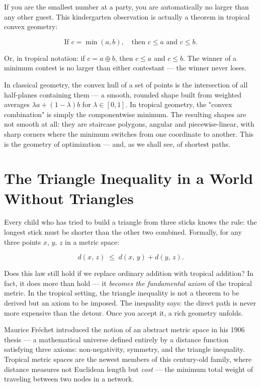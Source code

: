 \documentclass[11pt,twoside,openright]{book}
\theoremstyle{definition}
\theoremstyle{remark}
\begin{document}
If you are the smallest number at a party, you are automatically no larger than any other guest. This kindergarten observation is actually a theorem in tropical convex geometry:

\[\text{If } c = \min(a, b), \quad \text{then } c \le a \text{ and } c \le b.\]

Or, in tropical notation: if $c = a \oplus b$, then $c \le a$ and $c \le b$. The winner of a minimum contest is no larger than either contestant --- the winner never loses.


In classical geometry, the convex hull of a set of points is the intersection of all half-planes containing them --- a smooth, rounded shape built from weighted averages $\lambda a + (1 - \lambda)b$ for $\lambda \in [0,1]$. In tropical geometry, the "convex combination" is simply the componentwise minimum. The resulting shapes are not smooth at all: they are staircase polygons, angular and piecewise-linear, with sharp corners where the minimum switches from one coordinate to another. This is the geometry of optimization --- and, as we shall see, of shortest paths.


\section{The Triangle Inequality in a World Without Triangles}

Every child who has tried to build a triangle from three sticks knows the rule: the longest stick must be shorter than the other two combined. Formally, for any three points $x$, $y$, $z$ in a metric space:

\[d(x,\, z) \;\le\; d(x,\, y) + d(y,\, z).\]

Does this law still hold if we replace ordinary addition with tropical addition? In fact, it does more than hold --- it \textit{becomes the fundamental axiom} of the tropical metric. In the tropical setting, the triangle inequality is not a theorem to be derived but an axiom to be imposed. The inequality says: the direct path is never more expensive than the detour. Once you accept it, a rich geometry unfolds.


Maurice Fr\'echet introduced the notion of an abstract metric space in his 1906 thesis --- a mathematical universe defined entirely by a distance function satisfying three axioms: non-negativity, symmetry, and the triangle inequality. Tropical metric spaces are the newest members of this century-old family, where distance measures not Euclidean length but \textit{cost} --- the minimum total weight of traveling between two nodes in a network.
\end{document}
